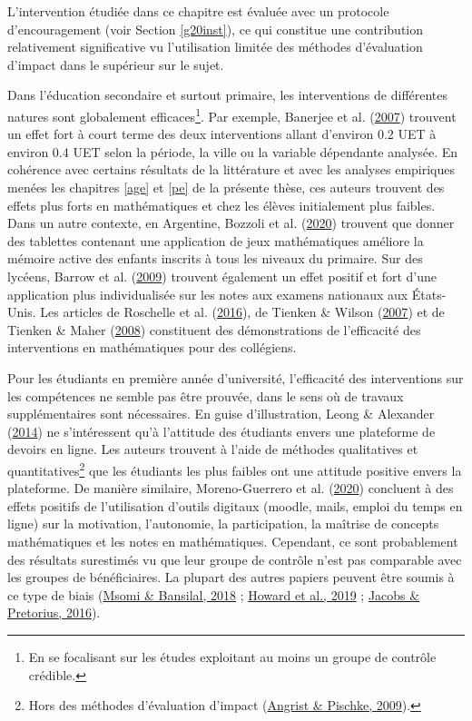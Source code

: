 \documentclass[
]{book}
\begin{document}
L'intervention étudiée dans ce chapitre est évaluée avec un protocole d'encouragement (voir Section \ref{g20inst}), ce qui constitue une contribution relativement significative vu l'utilisation limitée des méthodes d'évaluation d'impact dans le supérieur sur le sujet.

\quad Dans l'éducation secondaire et surtout primaire, les interventions de différentes natures sont globalement efficaces\footnote{En se focalisant sur les études exploitant au moins un groupe de contrôle crédible.}. Par exemple, Banerjee et al. (\protect\hyperlink{ref-BAN:eal:07}{2007}) trouvent un effet fort à court terme des deux interventions allant d'environ 0.2 UET à environ 0.4 UET selon la période, la ville ou la variable dépendante analysée. En cohérence avec certains résultats de la littérature et avec les analyses empiriques menées les chapitres \ref{age} et \ref{pe} de la présente thèse, ces auteurs trouvent des effets plus forts en mathématiques et chez les élèves initialement plus faibles. Dans un autre contexte, en Argentine, Bozzoli et al. (\protect\hyperlink{ref-BOZ:eal:20}{2020}) trouvent que donner des tablettes contenant une application de jeux mathématiques améliore la mémoire active des enfants inscrits à tous les niveaux du primaire. Sur des lycéens, Barrow et al. (\protect\hyperlink{ref-BAR:eal:09}{2009}) trouvent également un effet positif et fort d'une application plus individualisée sur les notes aux examens nationaux aux États-Unis. Les articles de Roschelle et al. (\protect\hyperlink{ref-ROS:eal:16}{2016}), de Tienken \& Wilson (\protect\hyperlink{ref-TIE:WIL:07}{2007}) et de Tienken \& Maher (\protect\hyperlink{ref-TIE:MAH:08}{2008}) constituent des démonstrations de l'efficacité des interventions en mathématiques pour des collégiens.

Pour les étudiants en première année d'université, l'efficacité des interventions sur les compétences ne semble pas être prouvée, dans le sens où de travaux supplémentaires sont nécessaires. En guise d'illustration, Leong \& Alexander (\protect\hyperlink{ref-LEO:AL:14}{2014}) ne s'intéressent qu'à l'attitude des étudiants envers une plateforme de devoirs en ligne. Les auteurs trouvent à l'aide de méthodes qualitatives et quantitatives\footnote{Hors des méthodes d'évaluation d'impact (\protect\hyperlink{ref-ANG:PIS:08}{Angrist \& Pischke, 2009}).} que les étudiants les plus faibles ont une attitude positive envers la plateforme. De manière similaire, Moreno-Guerrero et al. (\protect\hyperlink{ref-MOR:eal:20}{2020}) concluent à des effets positifs de l'utilisation d'outils digitaux (moodle, mails, emploi du temps en ligne) sur la motivation, l'autonomie, la participation, la maîtrise de concepts mathématiques et les notes en mathématiques. Cependant, ce sont probablement des résultats surestimés vu que leur groupe de contrôle n'est pas comparable avec les groupes de bénéficiaires. La plupart des autres papiers peuvent être soumis à ce type de biais (\protect\hyperlink{ref-MSO:BAN:18}{Msomi \& Bansilal, 2018} ; \protect\hyperlink{ref-HOW:eal:19}{Howard et al., 2019} ; \protect\hyperlink{ref-JAC:PRE:16}{Jacobs \& Pretorius, 2016}).
\end{document}
